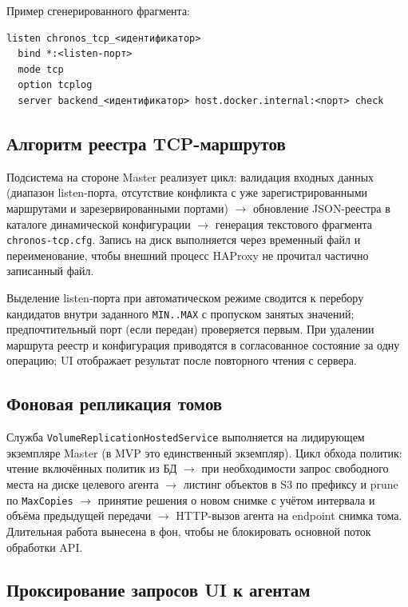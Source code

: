 \clearpage
\noindent Пример сгенерированного фрагмента:
\begin{lstlisting}[style=code,language={},caption={Фрагмент listen-секции HAProxy}]
listen chronos_tcp_<идентификатор>
  bind *:<listen-порт>
  mode tcp
  option tcplog
  server backend_<идентификатор> host.docker.internal:<порт> check
\end{lstlisting}

\subsection{Алгоритм реестра TCP-маршрутов}

Подсистема на стороне Master реализует цикл: валидация входных данных (диапазон listen-порта, отсутствие конфликта с уже зарегистрированными маршрутами и зарезервированными портами) $\rightarrow$ обновление JSON-реестра в каталоге динамической конфигурации $\rightarrow$ генерация текстового фрагмента \texttt{chronos-tcp.cfg}. Запись на диск выполняется через временный файл и переименование, чтобы внешний процесс HAProxy не прочитал частично записанный файл.

Выделение listen-порта при автоматическом режиме сводится к перебору кандидатов внутри заданного \texttt{MIN..MAX} с пропуском занятых значений; предпочтительный порт (если передан) проверяется первым. При удалении маршрута реестр и конфигурация приводятся в согласованное состояние за одну операцию; UI отображает результат после повторного чтения с сервера.

\subsection{Фоновая репликация томов}

Служба \texttt{VolumeReplicationHostedService} выполняется на лидирующем экземпляре Master (в MVP это единственный экземпляр). Цикл обхода политик: чтение включённых политик из БД $\rightarrow$ при необходимости запрос свободного места на диске целевого агента $\rightarrow$ листинг объектов в S3 по префиксу и prune по \texttt{MaxCopies} $\rightarrow$ принятие решения о новом снимке с учётом интервала и объёма предыдущей передачи $\rightarrow$ HTTP-вызов агента на endpoint снимка тома. Длительная работа вынесена в фон, чтобы не блокировать основной поток обработки API.

\subsection{Проксирование запросов UI к агентам}

